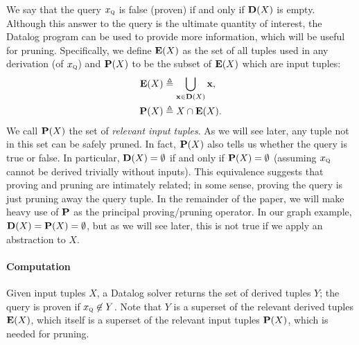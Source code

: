 We say that the query $x_\text{\sc q}$ is false (proven) if and only if $\mathbf{D}(X)$ is empty.
Although this answer to the query is the ultimate quantity of interest,
the Datalog program can be used to provide more information, which will be useful for pruning.
Specifically, we define $\mathbf{E}(X)$ as the set of all tuples used in any derivation (of $x_\text{\sc q}$)
and $\mathbf{P}(X)$ to be the subset of $\mathbf{E}(X)$ which are input tuples:
\begin{align}
\label{eqn:Pdef}
\mathbf{E}(X) &\triangleq \bigcup_{\mathbf{x} \in \mathbf{D}(X)} \mathbf{x}, \\
\mathbf{P}(X) &\triangleq X \cap \mathbf{E}(X).
\end{align}
We call $\mathbf{P}(X)$ the set of {\em relevant input tuples}.  As we will see later,
any tuple not in this set can be safely pruned.
In fact, $\mathbf{P}(X)$ also tells us whether the query is true or false.
In particular, $\mathbf{D}(X) = \emptyset$ if and only if $\mathbf{P}(X) = \emptyset$ (assuming $x_\text{\sc q}$ cannot be derived trivially without inputs).
This equivalence suggests that proving and pruning are intimately related;
in some sense, proving the query is just pruning away the query tuple.
In the remainder of the paper, we will make heavy use of $\mathbf{P}$ as the principal
proving/pruning operator.
In our graph example, $\mathbf{D}(X) = \mathbf{P}(X) = \emptyset$,
but as we will see later, this is not true if we apply an abstraction to $X$.

\paragraph{Computation}

Given input tuples $X$, a Datalog solver returns the set of derived tuples $Y$;
the query is proven if $x_\text{\sc q} \not\in Y$.  Note that $Y$ is a superset of the
relevant derived tuples $\mathbf{E}(X)$,
which itself is a superset of the relevant input tuples
$\mathbf{P}(X)$, which is needed for pruning.

